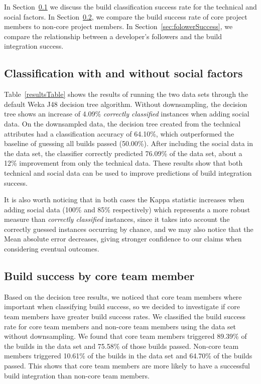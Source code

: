 \documentclass[10pt, conference]{IEEEtran}
\begin{document}
In Section~\ref{sec:successClassification} we discuss the build classification
success rate for the technical and social factors.  In Section~\ref{sec:core},
we compare the build success rate of core project members to non-core project
members.  In Section~\ref{sec:folowerSuccess}, we compare the relationship
between a developer's followers and the build integration success.

\subsection{Classification with and without social factors}
\label{sec:successClassification}

Table~\ref{resultsTable} shows the results of running the two data sets through the
default Weka J48 decision tree algorithm.  Without downsampling, the 
decision tree shows an increase of 4.09\% \textit{correctly classified} instances when adding social data. On the downsampled data, the decision tree created from the technical attributes
had a classification accuracy of 64.10\%, which outperformed the baseline of
guessing all builds passed (50.00\%).
 After including the social data
in the data set, the classifier correctly predicted 76.09\% of the data set,
about a 12\% improvement from only the technical data.  These results show that
both technical and social data can be used to improve predictions of build 
integration success.

It is also worth noticing that in both cases the Kappa statistic increases when
adding social data (100\% and 85\% respectively) which represents a more robust
measure than \textit{correctly classified} instances, since it takes into account the
correctly guessed instances occurring by chance, and we may also notice that the
Mean absolute error decreases, giving stronger confidence to our claims when
considering eventual outcomes. 

\subsection{Build success by core team member}
\label{sec:core}


Based on the decision tree results, we noticed that core team members where
important when classifying build success, so we decided to investigate if core
team members have greater build success rates.
We classified the build success rate for
core team members and non-core team members using the data set without 
downsampling.  We found that core team members
triggered 89.39\% of the builds in the data set and 75.58\% of those builds
passed.  Non-core team members triggered 10.61\% of the builds in the data set
and 64.70\% of the builds passed.  This shows that core team members are more
likely to have a successful build integration than non-core team members.
\end{document}
